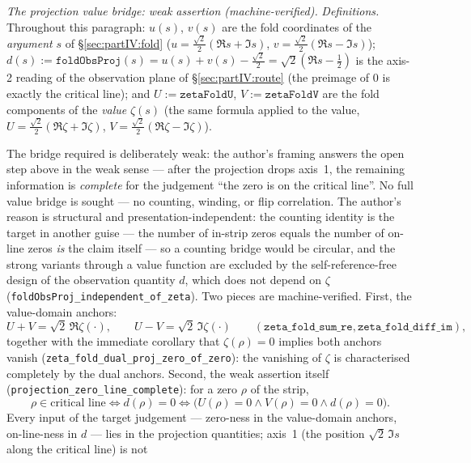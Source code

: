 \documentclass{article}
\newcommand{\zt}{\zeta}
\begin{document}
\par\emph{The projection value bridge: weak assertion (machine-verified).}
\emph{Definitions.} Throughout this paragraph: $u(s)$, $v(s)$ are the
fold coordinates of the \emph{argument} $s$ of \S\ref{sec:partIV:fold}
($u=\frac{\sqrt2}{2}(\Re s+\Im s)$, $v=\frac{\sqrt2}{2}(\Re s-\Im s)$);
$d(s):=\texttt{foldObsProj}(s)=u(s)+v(s)-\frac{\sqrt2}{2}
=\sqrt2(\Re s-\frac12)$ is the axis-2 reading of the observation plane
of \S\ref{sec:partIV:route} (the preimage of $0$ is exactly the critical
line); and $U:=\texttt{zetaFoldU}$, $V:=\texttt{zetaFoldV}$ are the fold
components of the \emph{value} $\zt(s)$ (the same formula applied to the
value, $U=\frac{\sqrt2}{2}(\Re\zt+\Im\zt)$,
$V=\frac{\sqrt2}{2}(\Re\zt-\Im\zt)$).
\par The bridge required is deliberately weak: the author's framing
answers the open step above in the weak sense --- after the projection
drops axis~1, the remaining information is \emph{complete} for the
judgement ``the zero is on the critical line''. No full value bridge is
sought --- no counting, winding, or flip correlation. The author's
reason is structural and presentation-independent: the counting
identity is the target in another guise --- the number of in-strip
zeros equals the number of on-line zeros \emph{is} the claim itself
--- so a counting bridge would be circular, and the strong variants
through a value function are excluded by the self-reference-free
design of the observation quantity $d$, which does not depend on
$\zt$ (\texttt{foldObsProj\_independent\_of\_zeta}). Two pieces are
machine-verified. First, the value-domain anchors:
\begin{equation}
  U+V=\sqrt2\,\Re\zt(\cdot),\qquad U-V=\sqrt2\,\Im\zt(\cdot)
  \qquad (\texttt{zeta\_fold\_sum\_re}, \texttt{zeta\_fold\_diff\_im}),
\end{equation}
together with the immediate corollary that $\zt(\rho)=0$ implies both
anchors vanish (\texttt{zeta\_fold\_dual\_proj\_zero\_of\_zero}): the
vanishing of $\zt$ is characterised completely by the dual anchors.
Second, the weak assertion itself
(\texttt{projection\_zero\_line\_complete}): for a zero $\rho$ of the
strip,
\begin{equation}
  \rho\in\text{critical line}
    \iff d(\rho)=0
    \iff \bigl(U(\rho)=0\wedge V(\rho)=0\wedge d(\rho)=0\bigr).
\end{equation}
Every input of the target judgement --- zero-ness in the value-domain
anchors, on-line-ness in $d$ --- lies in the projection quantities;
axis~1 (the position $\sqrt2\,\Im s$ along the critical line) is not
\end{document}
